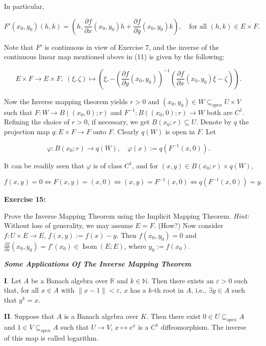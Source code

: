 \documentclass{book}
\begin{document}
In particular,

\[
F'(x_0, y_0)(h, k) = \left( h, \frac{\partial f}{\partial x}(x_0, y_0)h + \frac{\partial f}{\partial y}(x_0, y_0)k \right), \quad \text{for all } (h, k) \in E \times F.
\tag{11}
\]

Note that $F'$ is continuous in view of Exercise 7, and the inverse of the continuous linear map mentioned above in (11) is given by the following:

\[
E \times F \to E \times F, \; (\xi, \zeta) \mapsto \left( \xi, - \left( \frac{\partial f}{\partial y}(x_0, y_0) \right)^{-1} \left( \frac{\partial f}{\partial x}(x_0, y_0)\xi - \zeta \right) \right).
\]

Now the Inverse mapping theorem yields $r > 0$ and $(x_0, y_0) \in W \subseteq_{open} U \times V$ such that $F : W \to B((x_0, 0); r)$ and $F^{-1} : B((x_0, 0); r) \to W$ both are $C^1$. Refining the choice of $r > 0$, if necessary, we get $B(x_0; r) \subseteq U$. Denote by $q$ the projection map $q : E \times F \to F$ onto $F$. Clearly $q(W)$ is open in $F$. Let

\[
\varphi : B(x_0; r) \to q(W), \quad \varphi(x) := q(F^{-1}(x, 0)).
\]

It can be readily seen that $\varphi$ is of class $C^1$, and for $(x, y) \in B(x_0; r) \times q(W)$,

\[
f(x, y) = 0 \Longleftrightarrow F(x, y) = (x, 0) \Longleftrightarrow (x, y) = F^{-1}(x, 0) \Longleftrightarrow q(F^{-1}(x, 0)) = y.
\]

\textbf{Exercise 15:}

Prove the Inverse Mapping Theorem using the Implicit Mapping Theorem. \textit{Hint:} Without loss of generality, we may assume $E = F$. (How?) Now consider $f : U \times E \to E$, $f(x, y) := f(x) - y$. Then $f(x_0, y_0) = 0$ and $\frac{\partial f}{\partial x}(x_0, y_0) = f'(x_0) \in \operatorname{Isom}(E; E)$, where $y_0 := f(x_0)$.
\newpage
\begin{center}
    \textbf{\textit{Some Applications Of The Inverse Mapping Theorem}}
\end{center}


\textbf{I}. Let $A$ be a Banach algebra over $\mathbb{R}$ and $k \in \mathbb{N}$. Then there exists an $\varepsilon > 0$ such that, for all $x \in A$ with $\|x - 1\| < \varepsilon$, $x$ has a $k$-th root in $A$, i.e., $\exists y \in A$ such that $y^k = x$.

\textbf{II}. Suppose that $A$ is a Banach algebra over $K$. Then there exist $0 \in U \subseteq_{open} A$ and $1 \in V \subseteq_{open} A$ such that $U \to V$, $x \mapsto e^x$ is a $C^1$ diffeomorphism. The inverse of this map is called logarithm.
\end{document}
